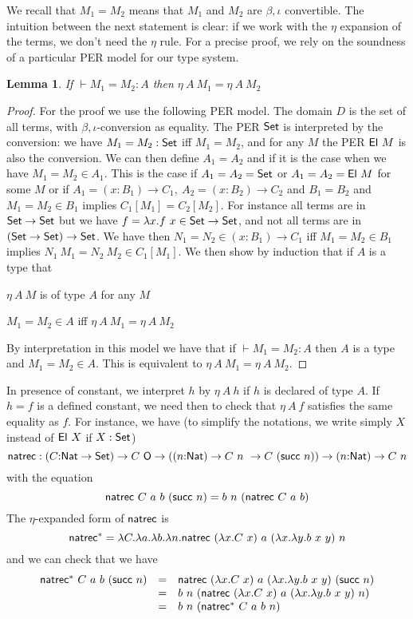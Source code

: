 \documentclass[11pt]{article}
\newtheorem{lemma}[theorem]{Lemma}
\def\SET{\hbox{\sf Set}}
\def\EL{\hbox{\sf El}}
\def\NAT{\hbox{\sf Nat}}
\def\NATREC{\hbox{\sf natrec}}
\def\ZERO{\hbox{\sf O}}
\def\SUCC{\hbox{\sf succ}}
\begin{document}
We recall that $M_1=M_2$ means that $M_1$ and $M_2$ are $\beta,\iota$ convertible.
The intuition between the next statement is clear: if we work with the $\eta$ expansion
of the terms, we don't need the $\eta$ rule. For a precise proof, we rely on
the soundness of  a particular PER model for our type system.

\begin{lemma}\label{betaiota}
If $\vdash M_1=M_2:A$ then $\eta~A~M_1 = \eta~A~M_2$
\end{lemma}

\begin{proof}
For the proof we use the following PER model. The domain $D$ is the set of all terms, with
$\beta,\iota$-conversion as equality. The PER $\SET$ is interpreted by the conversion: we
have $M_1=M_2:\SET$ iff $M_1=M_2$, and for any $M$ the PER $\EL~M$ is also the conversion.
We can then define $A_1=A_2$ and if it is the case when we have $M_1=M_2\in A_1$.
This is the case if $A_1=A_2=\SET$ or $A_1=A_2=\EL~M$ for some $M$ or
if $A_1=(x:B_1)\rightarrow C_1,~A_2=(x:B_2)\rightarrow C_2$ and $B_1 = B_2$
and $M_1=M_2\in B_1$ implies $C_1[M_1] = C_2[M_2]$. 
For instance all terms are in $\SET\rightarrow\SET$ but we have
$f=\lambda x.f~x\in\SET\rightarrow\SET$, and not all terms are
in $(\SET\rightarrow\SET)\rightarrow\SET$.
We have then
$N_1=N_2\in (x:B_1)\rightarrow C_1$ iff $M_1=M_2\in B_1$ implies
$N_1~M_1=N_2~M_2\in C_1[M_1]$.
We then show by induction that if $A$ is a type that

\medskip

 $\eta~A~M$ is of type $A$ for any $M$

\medskip

 $M_1=M_2\in A$ iff $\eta~A~M_1=\eta~A~M_2$

\medskip

 By interpretation in this model we have that if $\vdash M_1=M_2:A$ then $A$
is a type and $M_1=M_2\in A$. This is equivalent to  $\eta~A~M_1=\eta~A~M_2$.
\end{proof}


 In presence of constant, we interpret $h$ by $\eta~A~h$ if $h$ is declared of type
$A$. If $h=f$ is a defined constant, we need then to check that $\eta~A~f$ satisfies
the same equality as $f$. For instance, we have
(to simplify the notations, we write simply $X$ instead of $\EL~X$ if $X:\SET$)
$$
\NATREC:(C{:}\NAT\rightarrow\SET)\rightarrow C~\ZERO\rightarrow ((n{:}\NAT)\rightarrow C~n~\rightarrow C~(\SUCC~n))
                \rightarrow (n{:}\NAT)\rightarrow C~n
$$
with the equation
$$
\NATREC~C~a~b~(\SUCC~n) = b~n~(\NATREC~C~a~b)
$$
The $\eta$-expanded form of $\NATREC$ is 
$$\NATREC^*=\lambda C.\lambda a.\lambda b.\lambda n.\NATREC~(\lambda x.C~x)~a~(\lambda x.\lambda y.b~x~y)~n$$
and we can check that we have
$$
\begin{array}{ccl}
\NATREC^*~C~a~b~(\SUCC~n) & = & \NATREC~(\lambda x.C~x)~a~(\lambda x.\lambda y.b~x~y)~(\SUCC~n) \\
                          & = & b~n~(\NATREC~(\lambda x.C~x)~a~(\lambda x.\lambda y.b~x~y)~n) \\
                          & = & b~n~(\NATREC^*~C~a~b~n)
\end{array}
$$
\end{document}
